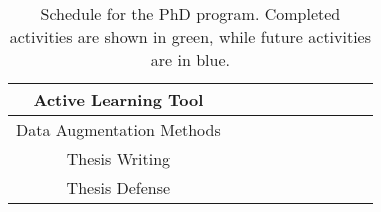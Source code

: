 \begin{table}[ht!]
\begin{tabular}{|c|c|c|c|c|c|c|c|c|c|}
    Active Learning Tool & & & &  & &  & \cellcolor{blue!25} &  & \\ \hline
    Data Augmentation Methods & & & &  & &  & & \cellcolor{blue!25} & \\ \hline
    Thesis Writing & & & & & & & & \cellcolor{blue!25} & \\ \hline
    Thesis Defense & & & & & & & & & \cellcolor{blue!25}  \\ \hline
  \end{tabular}
  \caption{Schedule for the PhD program. Completed activities are shown in green, while future activities are in blue.}
  \label{tab:schedule}
\end{table}